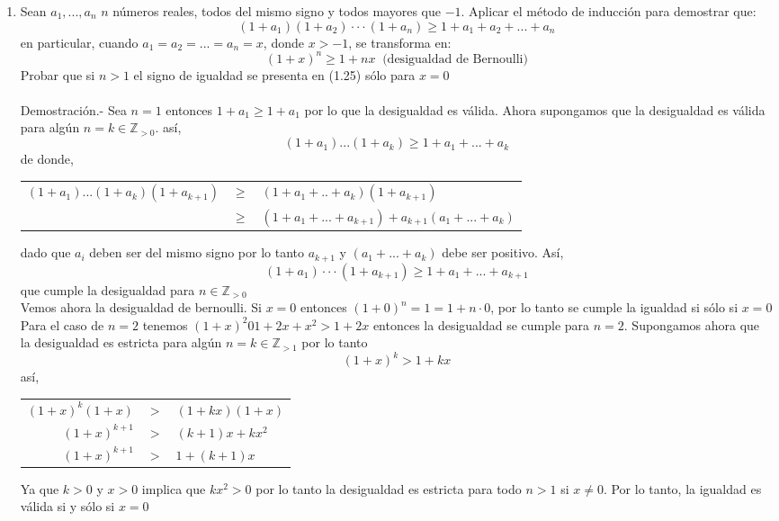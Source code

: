 \begin{enumerate}[ \bfseries 1.]
\item Sean $a_1,...,a_n$ $n$ números reales, todos del mismo signo y todos mayores que $-1$. Aplicar el método de inducción para demostrar que:
$$(1+a_1)(1+a_2)\cdot \cdot \cdot (1+ a_n) \geq 1 + a_1 + a_2 + ... + a_n$$
en particular, cuando $a_1=a_2=...=a_n=x$, donde $x>-1$, se transforma en:
$$(1+x)^n \geq 1+nx \; \; \mbox{(desigualdad de Bernoulli)}$$
Probar que si $n>1$ el signo de igualdad se presenta en (1.25) sólo para $x=0$\\\\
Demostración.- \; Sea $n=1$ entonces $1+a_1 \geq 1 + a_1$ por lo que la desigualdad es válida. Ahora supongamos que la desigualdad es válida para algún $n=k \in \mathbb{Z}_{>0}$. así,
$$(1+a_1)...(1+ a_k) \geq 1 + a_1 + ... + a_k$$ de donde,
\begin{center}
\begin{tabular}{rcl}
$(1+a_1)...(1+a_k)(1+a_{k+1})$&$\geq$&$(1+a_1 + .. + a_k)(1+a_{k+1})$\\
&$\geq$&$(1+a_1 + ... + a_{k+1})+ a_{k+1} (a_1+...+a_k)$\\
\end{tabular}
\end{center}
dado que $a_i$ deben ser del mismo signo por lo tanto $a_{k+1}$ y $(a_1+...+a_k)$ debe ser positivo. Así, $$(1+a_1)\cdot \cdot \cdot (1+a_{k+1}) \geq 1 + a_1 + ...+ a_{k+1}$$ que cumple la desigualdad para $n \in \mathbb{Z}_{>0}$\\
Vemos ahora la desigualdad de bernoulli. Si $x=0$ entonces $(1+0)^n = 1 = 1 + n\cdot 0$, por lo tanto se cumple la igualdad si sólo si $x=0$\\
Para el caso de $n=2$ tenemos $(1+x)^2 0 1+2x +x^2 > 1 + 2x$ entonces la desigualdad se cumple para $n=2$. Supongamos ahora que la desigualdad es estricta para algún $n=k \in \mathbb{Z}_{>1}$ por lo tanto$$(1+x)^k > 1 + kx$$ así,
\begin{center}
\begin{tabular}{rcl}
$(1+x)^k (1+x)$&$>$&$(1+kx)(1+x)$\\
$(1+x)^{k+1}$&$>$&$(k+1)x + kx^2$\\
$(1+x)^{k+1}$&$>$&$1 + (k+1)x$\\
\end{tabular}
\end{center}
Ya que $k>0$ y $x>0$ implica que $kx^2>0$ por lo tanto la desigualdad es estricta para todo $n>1$ si $x\neq 0$. Por lo tanto, la igualdad es válida si y sólo si $x=0$\\\\


\end{enumerate}
